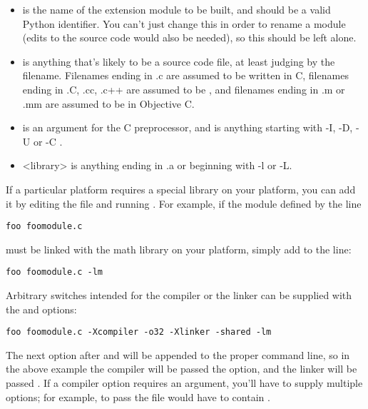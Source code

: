 \documentclass{howto}
\begin{document}
\begin{itemize}

\item {} is the name of the extension module to be built,
and should be a valid Python identifier.  You can't just change this
in order to rename a module (edits to the source code would also be
needed), so this should be left alone.

\item {} is anything that's likely to be a source code
file, at least judging by the filename.  Filenames ending in .c are
assumed to be written in C, filenames ending in .C, .cc, .c++ are
assumed to be \Cpp, and filenames ending in .m or .mm are assumed to
be in Objective C.

\item {} is an argument for the C preprocessor, 
and is anything starting with -I, -D, -U or -C .

\item <library> is anything ending in .a or beginning with -l or -L.
\end{itemize}

If a particular platform requires a special library on your platform,
you can add it by editing the  file and running
.  For example, if the module defined by the line

\begin{verbatim}
foo foomodule.c
\end{verbatim}

must be linked with the math library  on your platform,
simply add  to the line:

\begin{verbatim}
foo foomodule.c -lm
\end{verbatim}

Arbitrary switches intended for the compiler or the linker can be
supplied with the  and  options:

\begin{verbatim}
foo foomodule.c -Xcompiler -o32 -Xlinker -shared -lm
\end{verbatim}

The next option after  and  will be
appended to the proper command line, so in the above example the
compiler will be passed the  option, and the linker will be
passed .  If a compiler option requires an argument,
you'll have to supply multiple  options; for example,
to pass  the  file would have to contain
.  
\end{document}
